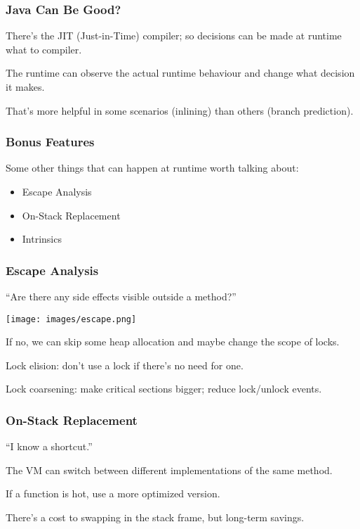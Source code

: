 \begin{frame}
\frametitle{Java Can Be Good?}

There's the JIT (Just-in-Time) compiler; so decisions can be made at runtime what to compiler.

The runtime can observe the actual runtime behaviour and change what decision it makes.

That's more helpful in some scenarios (inlining) than others (branch prediction).

\end{frame}

\begin{frame}
\frametitle{Bonus Features}
Some other things that can happen at runtime worth talking about:

\begin{itemize}
	\item Escape Analysis
	\item On-Stack Replacement
	\item Intrinsics
\end{itemize}

\end{frame}


\begin{frame}
\frametitle{Escape Analysis}

``Are there any side effects visible outside a method?''

\begin{center}
	\texttt{[image: images/escape.png]}
\end{center}

If no, we can skip some heap allocation and maybe change the scope of locks.

Lock elision: don't use a lock if there's no need for one.

Lock coarsening: make critical sections bigger; reduce lock/unlock events.

\end{frame}


\begin{frame}
\frametitle{On-Stack Replacement}

``I know a shortcut.''

The VM can switch between different implementations of the same method.

If a function is \alert{hot}, use a more optimized version.

There's a cost to swapping in the stack frame, but long-term savings.

\end{frame}

